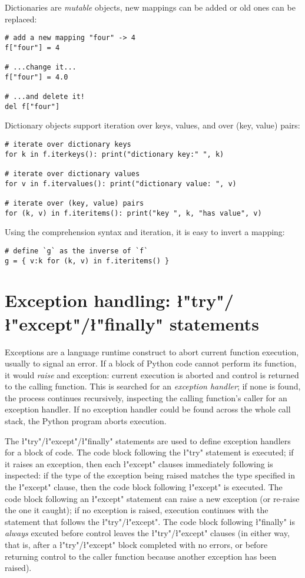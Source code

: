 Dictionaries are \emph{mutable} objects, new mappings can be added or
old ones can be replaced:
\begin{lstlisting}
# add a new mapping "four" -> 4
f["four"] = 4

# ...change it... 
f["four"] = 4.0

# ...and delete it!
del f["four"]
\end{lstlisting}

Dictionary objects support iteration over keys, values, and over (key,
value) pairs:
\begin{lstlisting}
# iterate over dictionary keys
for k in f.iterkeys(): print("dictionary key:" ", k)

# iterate over dictionary values
for v in f.itervalues(): print("dictionary value: ", v)

# iterate over (key, value) pairs
for (k, v) in f.iteritems(): print("key ", k, "has value", v)
\end{lstlisting}
Using the comprehension syntax and iteration, it is easy to invert a
mapping:
\begin{lstlisting}
# define `g` as the inverse of `f`
g = { v:k for (k, v) in f.iteritems() }
\end{lstlisting}


\section{Exception handling: \l"try"/\l"except"/\l"finally" statements}
\label{sec:try-except-finally}

Exceptions are a language runtime construct to abort current function
execution, usually to signal an error.  If a block of Python code
cannot perform its function, it would \emph{raise} and exception:
current execution is aborted and control is returned to the calling
function.  This is searched for an \emph{exception handler}; if none
is found, the process continues recursively, inspecting the calling
function's caller for an exception handler.  If no exception handler
could be found across the whole call stack, the Python program aborts
execution.

The \l"try"/\l"except"/\l"finally" statements
are used to define exception handlers for a block of code.  The code
block following the \l"try" statement is executed; if it
raises an exception, then each \l"except" clauses immediately
following is inspected: if the type of the exception being raised
matches the type specified in the \l"except" clause, then the
code block following \l"except" is executed. The code block
following an \l"except" statement can raise a new exception
(or re-raise the one it caught); if no exception is raised, execution
continues with the statement that follows the
\l"try"/\l"except".  The code block following
\l"finally" is \emph{always} excuted before control leaves the
\l"try"/\l"except" clauses (in either way, that is,
after a \l"try"/\l"except" block completed with no
errors, or before returning control to the caller function because
another exception has been raised).

